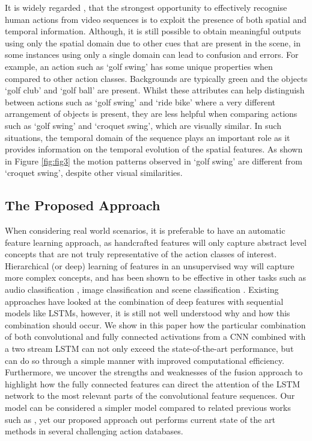\documentclass[10pt,twocolumn,letterpaper]{article}
\begin{document}
	
	It is widely regarded \cite{Simonyan2014, Jeff2015}, that the strongest opportunity to effectively recognise human actions from video sequences is to exploit the presence of both spatial and temporal information. Although, it is still possible to obtain meaningful outputs using only the spatial domain  due to other cues that are present in the scene, in some instances using only a single domain can lead to confusion and errors. For example, an action such as `golf swing' has some unique properties when compared to other action classes. Backgrounds are typically green and the objects `golf club' and `golf ball' are present. Whilst these attributes can help distinguish between actions such as `golf swing' and `ride bike' where a very different arrangement of objects is present, they are less helpful when comparing actions such as `golf swing' and `croquet swing', which are visually similar. In such situations, the temporal domain of the sequence plays an important role as it provides information on the temporal evolution of the spatial features. As shown in Figure \ref{fig:fig3} the motion patterns observed in `golf swing' are different from `croquet swing', despite other visual similarities. 	
	

\subsection{The Proposed Approach}
	
	When considering real world scenarios, it is preferable to have an automatic feature learning approach, as handcrafted features will only capture abstract level concepts that are not truly representative of the action classes of interest. Hierarchical (or deep) learning of features in an unsupervised  way will capture more complex concepts, and has been shown to be effective in other tasks such as audio classification \cite{deepaudio}, image classification \cite{deepImage1,deepImage2,deepImage3} and scene classification \cite{deepScene}. Existing approaches have looked at the combination of deep features with sequential models like LSTMs, however, it is still not well understood why and how this combination should occur. We show in this paper how the particular combination of both convolutional and fully connected activations from a CNN combined with a two stream LSTM can not only exceed the state-of-the-art performance, but can do so through a simple manner with improved computational efficiency. Furthermore, we uncover the strengths and weaknesses of the fusion approach to highlight how the fully connected features can direct the attention of the LSTM network to the most relevant parts of the convolutional feature sequences. Our model can be considered a simpler model compared to related previous works such as \cite{Simonyan2014, actiontubes, Jeff2015, Sharma2015, Yao2015}, yet our proposed approach out performs current state of the art methods in several challenging action databases.       
	
\end{document}
